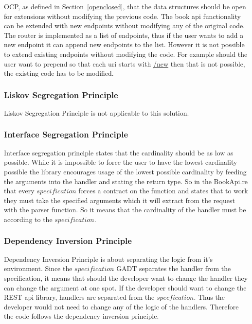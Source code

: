 OCP, as defined in Section~\ref{openclosed}, that the data structures should be
open for extensions without modifying the previous code.  The book api
functionality can be extended with new endpoints without modifying any of the
original code. The router is implemented as a list of endpoints, thus if the
user wants to add a new endpoint it can append new endpoints to the list.
However it is not possible to extend existing endpoints without modifying the
code.  For example should the user want to prepend so that each uri starts with
\url{/new} then that is not possible, the existing code has to be modified.

\subsubsection{Liskov Segregation Principle}

Liskov Segregation Principle is not applicable to this solution.

\subsubsection{Interface Segregation Principle}

Interface segregation principle states that the cardinality should be as low as
possible.  While it is impossible to force the user to have the lowest
cardinality possible the library encourages usage of the lowest possible
cardinality by feeding the arguments into the handler and stating the return
type. So in the BookApi.re that every $specification$ forces a contract on the
function and states that to work they must take the specified arguments which
it will extract from the request with the parser function. So it means that the
cardinality of the handler must be according to the $specification$.

\subsubsection{Dependency Inversion Principle}

Dependency Inversion Principle is about separating the logic from it's
environment.  Since the $specification$ GADT separates the handler from the
specification, it means that should the developer want to change the handler
they can change the argument at one spot. If the developer should want to
change the REST api library, handlers are separated from the
$specfication$. Thus the developer would not need to change any of the logic of
the handlers. Therefore the code follows the dependency inversion principle.

